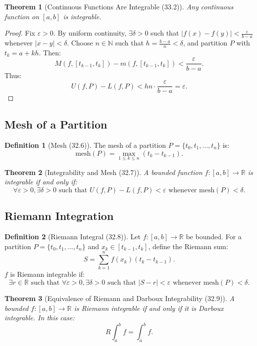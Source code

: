 \documentclass[9pt]{article}
\theoremstyle{definition}
\newtheorem{definition}{Definition}
\theoremstyle{plain}
\newtheorem{theorem}{Theorem}
\begin{document}
\begin{theorem}[Continuous Functions Are Integrable (33.2)]
Any continuous function on \( [a, b] \) is integrable.
\end{theorem}

\begin{proof}
Fix \( \varepsilon > 0 \). By uniform continuity, \( \exists \delta > 0 \) such that \( |f(x) - f(y)| < \frac{\varepsilon}{b-a} \) whenever \( |x - y| < \delta \). Choose \( n \in \mathbb{N} \) such that \( h = \frac{b-a}{n} < \delta \), and partition \( P \) with \( t_k = a + kh \). Then:
\[
M(f, [t_{k-1}, t_k]) - m(f, [t_{k-1}, t_k]) < \frac{\varepsilon}{b-a}.
\]
Thus:
\[
U(f, P) - L(f, P) < hn \cdot \frac{\varepsilon}{b-a} = \varepsilon.
\]
\end{proof}

\subsection*{Mesh of a Partition}
\begin{definition}[Mesh (32.6)]
The mesh of a partition \( P = \{t_0, t_1, \ldots, t_n\} \) is:
\[
\text{mesh}(P) = \max_{1 \leq k \leq n} (t_k - t_{k-1}).
\]
\end{definition}

\begin{theorem}[Integrability and Mesh (32.7)]
A bounded function \( f : [a, b] \to \mathbb{R} \) is integrable if and only if:
\[
\forall \varepsilon > 0, \exists \delta > 0 \text{ such that } U(f, P) - L(f, P) < \varepsilon \text{ whenever mesh}(P) < \delta.
\]
\end{theorem}

\subsection*{Riemann Integration}
\begin{definition}[Riemann Integral (32.8)]
Let \( f : [a, b] \to \mathbb{R} \) be bounded. For a partition \( P = \{t_0, t_1, \ldots, t_n\} \) and \( x_k \in [t_{k-1}, t_k] \), define the Riemann sum:
\[
S = \sum_{k=1}^n f(x_k)(t_k - t_{k-1}).
\]
\( f \) is Riemann integrable if:
\[
\exists r \in \mathbb{R} \text{ such that } \forall \varepsilon > 0, \exists \delta > 0 \text{ such that } |S - r| < \varepsilon \text{ whenever mesh}(P) < \delta.
\]
\end{definition}

\begin{theorem}[Equivalence of Riemann and Darboux Integrability (32.9)]
A bounded \( f : [a, b] \to \mathbb{R} \) is Riemann integrable if and only if it is Darboux integrable. In this case:
\[
R\int_a^b f = \int_a^b f.
\]
\end{theorem}
\end{document}
